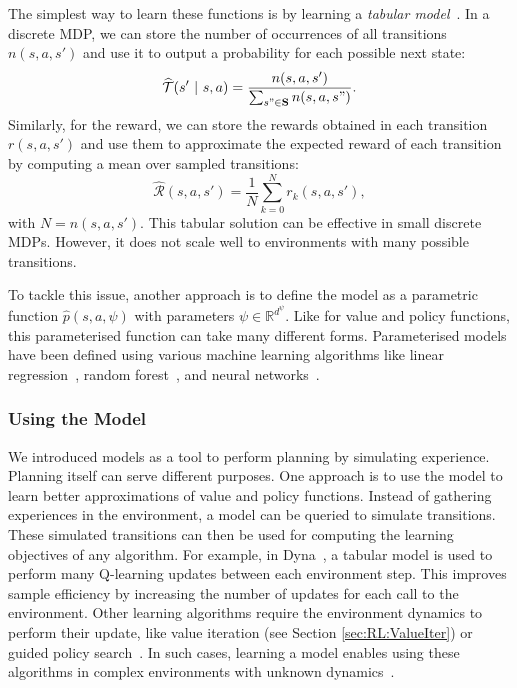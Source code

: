 The simplest way to learn these functions is by learning a \textit{tabular model}~\citep{Sutton1991_Dyna}. In a discrete MDP, we can store the number of occurrences of all transitions $n(s,a,s')$ and use it to output a probability for each possible next state:
\begin{equation}
    \widehat{\mathcal{T}}(s'\ |\ s,a)=\frac{n(s,a,s')}{\sum_{s"\in\mathbf{S}}n(s,a,s")}.
\end{equation}
Similarly, for the reward, we can store the rewards obtained in each transition $r(s,a,s')$ and use them to approximate the expected reward of each transition by computing a mean over sampled transitions:
\begin{equation}
    \widehat{\mathcal{R}}(s,a,s')=\frac{1}{N}\sum_{k=0}^{N}r_k(s,a,s'),
\end{equation}
with $N=n(s,a,s')$. 
This tabular solution can be effective in small discrete MDPs. However, it does not scale well to environments with many possible transitions.

To tackle this issue, another approach is to define the model as a parametric function $\widehat{p}(s,a,\psi)$ with parameters $\psi\in\mathbb{R}^{d^\psi}$. Like for value and policy functions, this parameterised function can take many different forms. Parameterised models have been defined using various machine learning algorithms like linear regression~\citep{Sutton2008_DynaLinearReg}, random forest~\citep{Hester2012_TEXPLORE}, and neural networks~\citep{Narendra1990_NNSystemIdent, Oh2015_DeepModel}. 

\subsubsection{Using the Model}
We introduced models as a tool to perform planning by simulating experience. Planning itself can serve different purposes. One approach is to use the model to learn better approximations of value and policy functions. Instead of gathering experiences in the environment, a model can be queried to simulate transitions. These simulated transitions can then be used for computing the learning objectives of any algorithm. For example, in Dyna~\citep{Sutton1991_Dyna}, a tabular model is used to perform many Q-learning updates between each environment step. This improves sample efficiency by increasing the number of updates for each call to the environment. Other learning algorithms require the environment dynamics to perform their update, like value iteration (see Section \ref{sec:RL:ValueIter}) or guided policy search~\citep{Levine2013_GPS}. In such cases, learning a model enables using these algorithms in complex environments with unknown dynamics~\citep{Abbeel2006_Helicopter,Levine2014_GPS-model}. 

